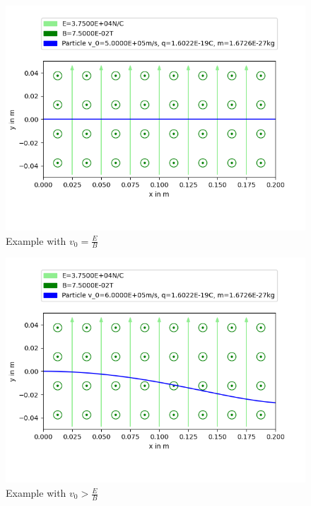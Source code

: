 \documentclass[a4paper, 10pt]{article}
\begin{document}
\begin{figure}[ht]
\caption{Example with $v_0=\frac{E}{B}$}
\centering
\includegraphics[width=\textwidth]{figure_3}
\end{figure}
\begin{figure}[ht]
\caption{Example with $v_0>\frac{E}{B}$}
\centering
\includegraphics[width=\textwidth]{figure_1}
\end{figure}
\end{document}
